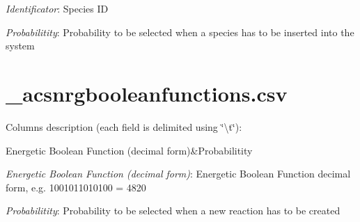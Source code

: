 \begin{DoxyItemize}
\item {\itshape Identificator}\-: Species I\-D
\item {\itshape Probabilitity}\-: Probability to be selected when a species has to be inserted into the system \par
 
\end{DoxyItemize}\hypertarget{page_init_str_subEnergy}{}\section{\-\_\-acsnrgbooleanfunctions.\-csv}\label{page_init_str_subEnergy}
Columns description (each field is delimited using \char`\"{}\textbackslash{}t\char`\"{})\-: \begin{TabularC}{2}
\hline
Energetic Boolean Function (decimal form)&Probabilitity  \\
\end{TabularC}

\begin{DoxyItemize}
\item {\itshape Energetic Boolean Function (decimal form)}\-: Energetic Boolean Function decimal form, e.\-g. 1001011010100 = 4820
\item {\itshape Probabilitity}\-: Probability to be selected when a new reaction has to be created 
\end{DoxyItemize}